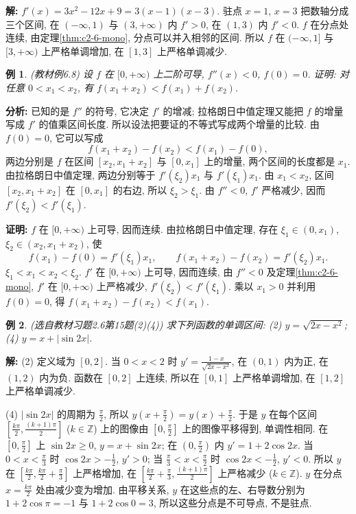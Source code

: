 \documentclass[UTF8,openany]{ctexbook}
\theoremstyle{chinesetextbook}
\newtheorem{example}{例}[section]
\newenvironment{cnproof}{\par\indent\textbf{证明:} \ignorespaces}{\par}
\newenvironment{cnsolution}{\par\indent\textbf{解:} \ignorespaces}{\par}
\begin{document}
\begin{cnsolution}
$f'(x)=3x^2-12x+9=3(x-1)(x-3)$. 驻点 $x=1$, $x=3$ 把数轴分成三个区间, 在 $(-\infty,1)$ 与 $(3,+\infty)$ 内 $f'>0$, 在 $(1,3)$ 内 $f'<0$. $f$ 在分点处连续, 由定理\ref{thm:c2-6-mono}, 分点可以并入相邻的区间. 所以 $f$ 在 $(-\infty,1]$ 与 $[3,+\infty)$ 上严格单调增加, 在 $[1,3]$ 上严格单调减少.
\end{cnsolution}
\begin{example}\label{ex:c2-6-8}
\textnormal{(教材例6.8)} 设 $f$ 在 $[0,+\infty)$ 上二阶可导, $f''(x)<0$, $f(0)=0$. 证明: 对任意 $0<x_1<x_2$, 有 $f(x_1+x_2)<f(x_1)+f(x_2)$.
\end{example}
\par\indent\textbf{分析:} 已知的是 $f''$ 的符号, 它决定 $f'$ 的增减; 拉格朗日中值定理又能把 $f$ 的增量写成 $f'$ 的值乘区间长度. 所以设法把要证的不等式写成两个增量的比较. 由 $f(0)=0$, 它可以写成
\[
f(x_1+x_2)-f(x_2)<f(x_1)-f(0),
\]
两边分别是 $f$ 在区间 $[x_2,x_1+x_2]$ 与 $[0,x_1]$ 上的增量, 两个区间的长度都是 $x_1$. 由拉格朗日中值定理, 两边分别等于 $f'(\xi_2)x_1$ 与 $f'(\xi_1)x_1$. 由 $x_1<x_2$, 区间 $[x_2,x_1+x_2]$ 在 $[0,x_1]$ 的右边, 所以 $\xi_2>\xi_1$. 由 $f''<0$, $f'$ 严格减少, 因而 $f'(\xi_2)<f'(\xi_1)$.
\begin{cnproof}
$f$ 在 $[0,+\infty)$ 上可导, 因而连续. 由拉格朗日中值定理, 存在 $\xi_1\in(0,x_1)$, $\xi_2\in(x_2,x_1+x_2)$, 使
\[
f(x_1)-f(0)=f'(\xi_1)x_1,\qquad f(x_1+x_2)-f(x_2)=f'(\xi_2)x_1.
\]
$\xi_1<x_1<x_2<\xi_2$. $f'$ 在 $[0,+\infty)$ 上可导, 因而连续, 由 $f''<0$ 及定理\ref{thm:c2-6-mono}, $f'$ 在 $[0,+\infty)$ 上严格减少, $f'(\xi_2)<f'(\xi_1)$. 乘以 $x_1>0$ 并利用 $f(0)=0$, 得 $f(x_1+x_2)-f(x_2)<f(x_1)$.
\end{cnproof}
\begin{example}\label{ex:c2-h6-15}
\textnormal{(选自教材习题2.6第15题(2)(4))} 求下列函数的单调区间: (2) $y=\sqrt{2x-x^2}$; (4) $y=x+\lvert\sin2x\rvert$.
\end{example}
\begin{cnsolution}
(2) 定义域为 $[0,2]$. 当 $0<x<2$ 时 $\displaystyle y'=\frac{1-x}{\sqrt{2x-x^2}}$, 在 $(0,1)$ 内为正, 在 $(1,2)$ 内为负. 函数在 $[0,2]$ 上连续, 所以在 $[0,1]$ 上严格单调增加, 在 $[1,2]$ 上严格单调减少.

(4) $\lvert\sin2x\rvert$ 的周期为 $\displaystyle\frac\pi2$, 所以 $\displaystyle y\left(x+\frac\pi2\right)=y(x)+\frac\pi2$. 于是 $y$ 在每个区间 $\displaystyle\left[\frac{k\pi}2,\frac{(k+1)\pi}2\right]$ ($k\in\mathbb Z$) 上的图像由 $\displaystyle\left[0,\frac\pi2\right]$ 上的图像平移得到, 单调性相同. 在 $\displaystyle\left[0,\frac\pi2\right]$ 上 $\sin2x\ge0$, $y=x+\sin2x$; 在 $\displaystyle\left(0,\frac\pi2\right)$ 内 $y'=1+2\cos2x$. 当 $\displaystyle0<x<\frac\pi3$ 时 $\displaystyle\cos2x>-\frac12$, $y'>0$; 当 $\displaystyle\frac\pi3<x<\frac\pi2$ 时 $\displaystyle\cos2x<-\frac12$, $y'<0$. 所以 $y$ 在 $\displaystyle\left[\frac{k\pi}2,\frac{k\pi}2+\frac\pi3\right]$ 上严格增加, 在 $\displaystyle\left[\frac{k\pi}2+\frac\pi3,\frac{(k+1)\pi}2\right]$ 上严格减少 ($k\in\mathbb Z$). $y$ 在分点 $\displaystyle x=\frac{k\pi}2$ 处由减少变为增加. 由平移关系, $y$ 在这些点的左、右导数分别为 $1+2\cos\pi=-1$ 与 $1+2\cos0=3$, 所以这些分点是不可导点, 不是驻点.
\end{cnsolution}
\end{document}
